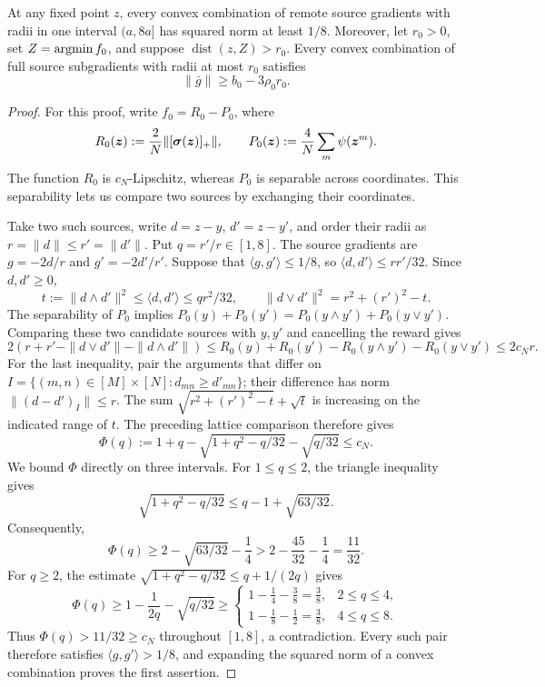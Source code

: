 {\begin{lemma}
\label{newrand:mixtures}
At any fixed point $z$, every convex combination of remote source
gradients with radii in one interval $(a,8a]$ has squared norm
at least $1/8$.
Moreover, let $r_0>0$, set $Z=\operatorname*{argmin} f_0$, and suppose
$\operatorname{dist}(z,Z)>r_0$. Every convex combination of full
source subgradients with radii at most $r_0$ satisfies
\[
 \|\bar g\|\geq b_0-3\rho_0r_0.
\]
\end{lemma}
\begin{proof}
For this proof, write $f_0=R_0-P_0$, where
\[
 R_0(\bm{z}):=\frac2N\|[\boldsymbol\sigma(\bm{z})]_+\|,
 \qquad P_0(\bm{z}):=\frac4N\sum_m\psi(\bm{z}^m).
\]
The function $R_0$ is $c_N$-Lipschitz, whereas $P_0$ is
separable across coordinates. This separability lets us compare
two sources by exchanging their coordinates.

Take two such sources, write $d=z-y$, $d'=z-y'$, and order their
radii as $r=\|d\|\le r'=\|d'\|$. Put $q=r'/r\in[1,8]$.
The source gradients are $g=-2d/r$ and $g'=-2d'/r'$. Suppose that
$\langle g,g'\rangle\le1/8$, so
$\langle d,d'\rangle\le rr'/32$. Since $d,d'\ge0$,
\[
 t:=\|d\wedge d'\|^2\le\langle d,d'\rangle\le qr^2/32,
 \qquad \|d\vee d'\|^2=r^2+(r')^2-t.
\]
The separability of $P_0$ implies
$P_0(y)+P_0(y')=P_0(y\wedge y')+P_0(y\vee y')$.
Comparing these two candidate sources with $y,y'$ and cancelling
the reward gives
\[
 2(r+r'-\|d\vee d'\|-\|d\wedge d'\|)
 \leq R_0(y)+R_0(y')-R_0(y\wedge y')-R_0(y\vee y')
 \leq2c_Nr.
\]
For the last inequality, pair the arguments that differ on
$I=\{(m,n)\in[M]\times[N]:d_{mn}\geq d'_{mn}\}$; their difference has norm
$\|(d-d')_I\|\leq r$.
The sum $\sqrt{r^2+(r')^2-t}+\sqrt t$ is increasing on the indicated
range of $t$. The preceding lattice comparison therefore gives
\[
 \Phi(q):=1+q-\sqrt{1+q^2-q/32}-\sqrt{q/32}\le c_N.
\]
We bound $\Phi$ directly on three intervals.
For $1\le q\le2$, the triangle inequality gives
\[
 \sqrt{1+q^2-q/32}
 \le q-1+\sqrt{63/32}.
\]
Consequently,
\[
 \Phi(q)\ge2-\sqrt{63/32}-\frac14
 >2-\frac{45}{32}-\frac14=\frac{11}{32}.
\]
For $q\ge2$, the estimate
$\sqrt{1+q^2-q/32}\le q+1/(2q)$ gives
\[
 \Phi(q)\ge1-\frac1{2q}-\sqrt{q/32}
 \ge
 \begin{cases}
 1-\frac14-\frac38=\frac38,&2\le q\le4,\\
 1-\frac18-\frac12=\frac38,&4\le q\le8.
 \end{cases}
\]
Thus $\Phi(q)>11/32\ge c_N$ throughout $[1,8]$, a
contradiction. Every such pair therefore satisfies
$\langle g,g'\rangle>1/8$, and expanding the squared norm
of a convex combination proves the first assertion.


\end{proof}}
